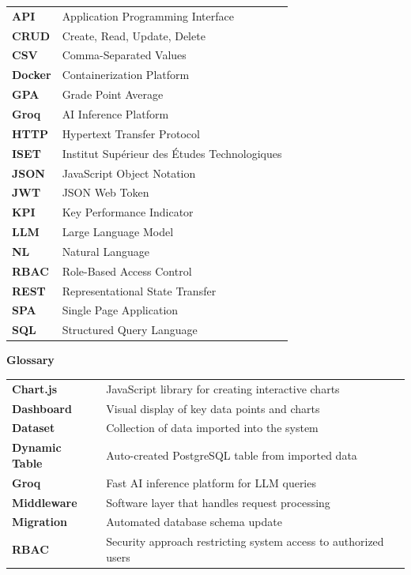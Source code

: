 \documentclass[12pt,a4paper]{report}
\begin{document}
\begin{table}[H]\begin{tabular}{p{} p{}}
\textbf{API} & Application Programming Interface \\
\textbf{CRUD} & Create, Read, Update, Delete \\
\textbf{CSV} & Comma-Separated Values \\
\textbf{Docker} & Containerization Platform \\
\textbf{GPA} & Grade Point Average \\
\textbf{Groq} & AI Inference Platform \\
\textbf{HTTP} & Hypertext Transfer Protocol \\
\textbf{ISET} & Institut Supérieur des Études Technologiques \\
\textbf{JSON} & JavaScript Object Notation \\
\textbf{JWT} & JSON Web Token \\
\textbf{KPI} & Key Performance Indicator \\
\textbf{LLM} & Large Language Model \\
\textbf{NL} & Natural Language \\
\textbf{RBAC} & Role-Based Access Control \\
\textbf{REST} & Representational State Transfer \\
\textbf{SPA} & Single Page Application \\
\textbf{SQL} & Structured Query Language \\
\end{tabular}\end{table}

\newpage
\begin{center}
{\Large\bfseries Glossary}
\end{center}
\vspace{0.5cm}

\begin{table}[H]\begin{tabular}{p{} p{}}
\textbf{Chart.js} & JavaScript library for creating interactive charts \\
\textbf{Dashboard} & Visual display of key data points and charts \\
\textbf{Dataset} & Collection of data imported into the system \\
\textbf{Dynamic Table} & Auto-created PostgreSQL table from imported data \\
\textbf{Groq} & Fast AI inference platform for LLM queries \\
\textbf{Middleware} & Software layer that handles request processing \\
\textbf{Migration} & Automated database schema update \\
\textbf{RBAC} & Security approach restricting system access to authorized users \\
\end{tabular}\end{table}
\end{document}
